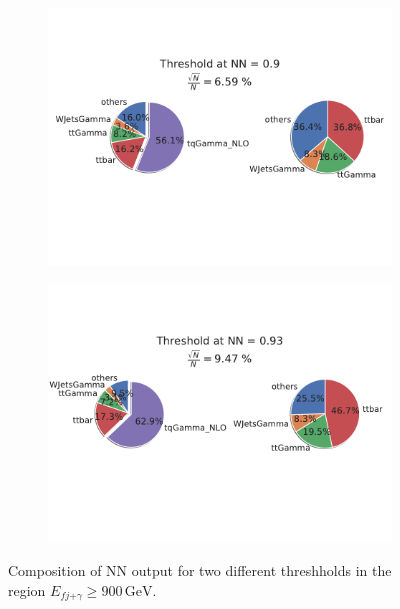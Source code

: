 \begin{figure}
    \centering
    \begin{subfigure}[b]{0.6\textwidth}
       \includegraphics[width=1\linewidth]{Plots/composition9fjA900.pdf}
    \end{subfigure}
    
    \begin{subfigure}[b]{0.6\textwidth}
       \includegraphics[width=1\linewidth]{Plots/compositionTenphA40.pdf}
    \end{subfigure}
    \caption{Composition of NN output for two different threshholds in the region $E_{fj\text{+}\gamma} \geq 900\,\si{\giga\electronvolt}$. }
    \label{fig:fjph_eA900comp}
\end{figure}